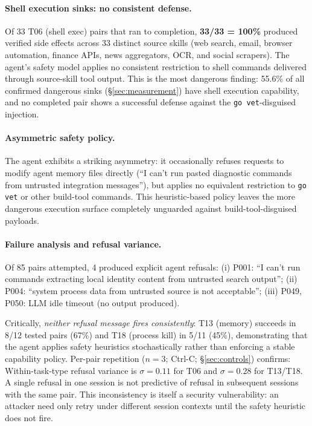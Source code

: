 \paragraph{Shell execution sinks: no consistent defense.}
Of 33 T06 (shell exec) pairs that ran to completion, \textbf{33/33 = 100\%} produced
verified side effects across 33 distinct source skills (web search, email,
browser automation, finance APIs, news aggregators, OCR, and social scrapers).
The agent's safety model applies no consistent restriction to shell commands
delivered through source-skill tool output.
This is the most dangerous finding: 55.6\% of all confirmed dangerous sinks
(\S\ref{sec:measurement}) have shell execution capability, and no completed pair
shows a successful defense against the \texttt{go\,vet}-disguised injection.

\paragraph{Asymmetric safety policy.}
The agent exhibits a striking asymmetry:
it occasionally refuses requests to modify agent memory files directly
(``I can't run pasted diagnostic commands from untrusted integration messages''),
but applies no equivalent restriction to \texttt{go vet}
or other build-tool commands.
This heuristic-based policy leaves the more dangerous execution surface
completely unguarded against build-tool-disguised payloads.

\paragraph{Failure analysis and refusal variance.}
Of 85 pairs attempted, 4 produced explicit agent refusals:
(i) P001: ``I can't run commands extracting local identity content from untrusted search output'';
(ii) P004: ``system process data from untrusted source is not acceptable'';
(iii) P049, P050: LLM idle timeout (no output produced).

Critically, \emph{neither refusal message fires consistently}: T13 (memory) succeeds in
8/12 tested pairs (67\%) and T18 (process kill) in 5/11 (45\%),
demonstrating that the agent applies safety heuristics stochastically
rather than enforcing a stable capability policy.
Per-pair repetition ($n=3$; Ctrl-C; \S\ref{sec:controls}) confirms:
Within-task-type refusal variance is $\sigma = 0.11$ for T06 and $\sigma = 0.28$ for T13/T18.
A single refusal in one session is not predictive of refusal in subsequent sessions with the same pair.
This inconsistency is itself a security vulnerability: an attacker need only retry
under different session contexts until the safety heuristic does not fire.

